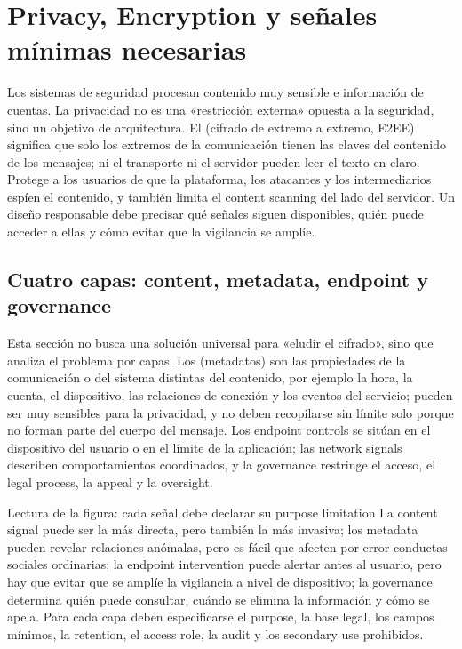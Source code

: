 \section{Privacy, Encryption y señales mínimas necesarias}

Los sistemas de seguridad procesan contenido muy sensible e información de cuentas. La privacidad no es una «restricción externa» opuesta a la seguridad, sino un objetivo de arquitectura. El  (cifrado de extremo a extremo, E2EE) significa que solo los extremos de la comunicación tienen las claves del contenido de los mensajes; ni el transporte ni el servidor pueden leer el texto en claro. Protege a los usuarios de que la plataforma, los atacantes y los intermediarios espíen el contenido, y también limita el content scanning del lado del servidor. Un diseño responsable debe precisar qué señales siguen disponibles, quién puede acceder a ellas y cómo evitar que la vigilancia se amplíe.

\subsection{Cuatro capas: content, metadata, endpoint y governance}

Esta sección no busca una solución universal para «eludir el cifrado», sino que analiza el problema por capas. Los  (metadatos) son las propiedades de la comunicación o del sistema distintas del contenido, por ejemplo la hora, la cuenta, el dispositivo, las relaciones de conexión y los eventos del servicio; pueden ser muy sensibles para la privacidad, y no deben recopilarse sin límite solo porque no forman parte del cuerpo del mensaje. Los endpoint controls se sitúan en el dispositivo del usuario o en el límite de la aplicación; las network signals describen comportamientos coordinados, y la governance restringe el acceso, el legal process, la appeal y la oversight.


\begin{knowledgebox}{Lectura de la figura: cada señal debe declarar su purpose limitation}
La content signal puede ser la más directa, pero también la más invasiva; los metadata pueden revelar relaciones anómalas, pero es fácil que afecten por error conductas sociales ordinarias; la endpoint intervention puede alertar antes al usuario, pero hay que evitar que se amplíe la vigilancia a nivel de dispositivo; la governance determina quién puede consultar, cuándo se elimina la información y cómo se apela. Para cada capa deben especificarse el purpose, la base legal, los campos mínimos, la retention, el access role, la audit y los secondary use prohibidos.
\end{knowledgebox}

